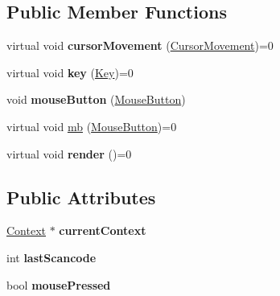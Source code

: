 \subsection*{Public Member Functions}
\begin{DoxyCompactItemize}
\item 
virtual void {\bfseries cursor\+Movement} (\hyperlink{classCursorMovement}{Cursor\+Movement})=0\hypertarget{classContext_aa940262b2ab80eea625f768f0b6fac7a}{}\label{classContext_aa940262b2ab80eea625f768f0b6fac7a}

\item 
virtual void {\bfseries key} (\hyperlink{classKey}{Key})=0\hypertarget{classContext_a70da8923b6a5a138d8603c609bc31fa6}{}\label{classContext_a70da8923b6a5a138d8603c609bc31fa6}

\item 
void {\bfseries mouse\+Button} (\hyperlink{classMouseButton}{Mouse\+Button})\hypertarget{classContext_a3999d157f67e3ba18cd704a5d4f0178a}{}\label{classContext_a3999d157f67e3ba18cd704a5d4f0178a}

\item 
virtual void \hyperlink{classContext_ab47a1f761c1408d246ef99159b197d3a}{mb} (\hyperlink{classMouseButton}{Mouse\+Button})=0
\item 
virtual void {\bfseries render} ()=0\hypertarget{classContext_a8fb1191127d9d8b5d7c356fc62189d9a}{}\label{classContext_a8fb1191127d9d8b5d7c356fc62189d9a}

\end{DoxyCompactItemize}
\subsection*{Public Attributes}
\begin{DoxyCompactItemize}
\item 
\hyperlink{classContext}{Context} $\ast$ {\bfseries current\+Context}\hypertarget{classContext_a16b34e7c1aae337963724ec597e4750d}{}\label{classContext_a16b34e7c1aae337963724ec597e4750d}

\item 
int {\bfseries last\+Scancode}\hypertarget{classContext_af2a331132fbccf0a841f1f9ba47d4203}{}\label{classContext_af2a331132fbccf0a841f1f9ba47d4203}

\item 
bool {\bfseries mouse\+Pressed}\hypertarget{classContext_ac3e36ee8fc5f660558345e72149a56ab}{}\label{classContext_ac3e36ee8fc5f660558345e72149a56ab}

\end{DoxyCompactItemize}


